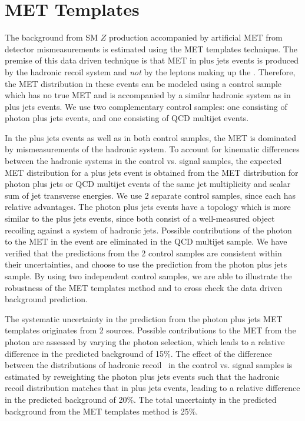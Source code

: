 \section{MET Templates}
\label{sec:templates}

The background from SM $Z$ production accompanied by artificial MET from detector mismeasurements
is estimated using the MET templates technique.
The premise of this data driven technique is that MET in \Z plus jets events
is produced by the hadronic recoil system and {\it not} by the leptons making up the \Z.
Therefore, the MET distribution in these events can be modeled using a control sample
which has no true MET and is accompanied by a similar hadronic system as in \Z plus jets events.
We use two complementary control samples: one consisting of photon plus jets events, and one
consisting of QCD multijet events. 

In the \Z plus jets events as well as in both control samples, the MET is dominated by mismeasurements
of the hadronic system. To account for kinematic 
differences between the hadronic systems in the control vs. signal samples, 
the expected MET distribution for a \Z plus jets event is obtained from the MET distribution
for photon plus jets or QCD multijet events of the same jet multiplicity and scalar sum 
of jet transverse energies.
We use 2 separate control samples, since each has relative advantages. The photon plus jets events have a topology
which is more similar to the \Z plus jets events, since both consist of a well-measured
object recoiling against a system of hadronic jets. Possible contributions of the photon
to the MET in the event are eliminated in the QCD multijet sample. We have verified that
the predictions from the 2 control samples are consistent within their uncertainties, and
choose to use the prediction from the photon plus jets sample.
By using two independent control samples, we are able to illustrate
the robustness of the MET templates method and to cross check the data driven background 
prediction.

The systematic uncertainty in the prediction from the photon plus jets MET templates
originates from 2 sources. Possible contributions to the MET from the photon are assessed
by varying the photon selection, which leads to a relative difference in the predicted
background of 15\%. The effect of the difference between the distributions of hadronic recoil \pt\
in the control vs. signal samples is estimated by reweighting the photon plus jets events such
that the hadronic recoil \pt distribution matches that in \Z plus jets events, leading to a relative
difference in the predicted background of 20\%. The total uncertainty in the predicted background
from the MET templates method is 25\%.
